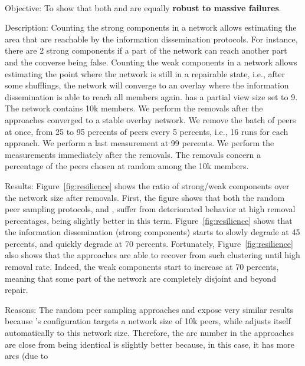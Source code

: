 \ \\

\begin{asparadesc}
\item[Objective:] To show that both \SPRAY and \CYCLON are equally
  \textbf{robust to massive failures}.
\item[Description:] Counting the strong components in a network allows
  estimating the area that are reachable by the information dissemination
  protocols. For instance, there are 2 strong components if a part of the
  network can reach another part and the converse being false.  Counting the
  weak components in a network allows estimating the point where the network is
  still in a repairable state, i.e., after some shufflings, the network will
  converge to an overlay where the information dissemination is able to reach
  all members again. \CYCLON has a partial view size set to 9. The network
  contains 10k members. We perform the removals after the approaches converged
  to a stable overlay network. We remove the batch of peers at once, from 25 to
  95 percents of peers every 5 percents, i.e., 16 runs for each approach. We
  perform a last measurement at 99 percents. We perform the measurements
  immediately after the removals. The removals concern a percentage of the
  peers chosen at random among the 10k members.
\item[Results:] Figure~\ref{fig:resilience} shows the ratio of strong/weak
  components over the network size after removals. First, the figure shows
  that both the random peer sampling protocols, \SPRAY and \CYCLON, suffer from
  deteriorated behavior at high removal percentages, \CYCLON being slightly
  better in this term. Figure~\ref{fig:resilience} shows that the information
  dissemination (strong components) starts to slowly degrade at 45 percents,
  and quickly degrade at 70 percents. Fortunately, Figure~\ref{fig:resilience}
  also shows that the approaches are able to recover from such clustering until
  high removal rate. Indeed, the weak components start to increase at 70
  percents, meaning that some part of the network are completely disjoint and
  beyond repair.
\item[Reasons:] The random peer sampling approaches \CYCLON and \SPRAY expose
  very similar results because \CYCLON's configuration targets a network size
  of 10k peers, while \SPRAY adjusts itself automatically to this network size.
  Therefore, the arc number in the approaches are close from being identical
  \CYCLON is slightly better because, in this case, it has more arcs (due to

\end{asparadesc}

